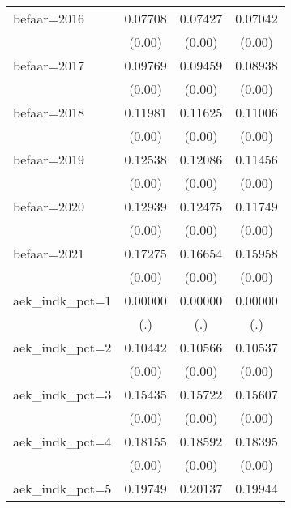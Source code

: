 \begin{table}[htbp]
\begin{tabular}{l*{3}{c}}
befaar=2016         &     0.07708\sym{***}&     0.07427\sym{***}&     0.07042\sym{***}\\
                    &      (0.00)         &      (0.00)         &      (0.00)         \\
befaar=2017         &     0.09769\sym{***}&     0.09459\sym{***}&     0.08938\sym{***}\\
                    &      (0.00)         &      (0.00)         &      (0.00)         \\
befaar=2018         &     0.11981\sym{***}&     0.11625\sym{***}&     0.11006\sym{***}\\
                    &      (0.00)         &      (0.00)         &      (0.00)         \\
befaar=2019         &     0.12538\sym{***}&     0.12086\sym{***}&     0.11456\sym{***}\\
                    &      (0.00)         &      (0.00)         &      (0.00)         \\
befaar=2020         &     0.12939\sym{***}&     0.12475\sym{***}&     0.11749\sym{***}\\
                    &      (0.00)         &      (0.00)         &      (0.00)         \\
befaar=2021         &     0.17275\sym{***}&     0.16654\sym{***}&     0.15958\sym{***}\\
                    &      (0.00)         &      (0.00)         &      (0.00)         \\
aek\_indk\_pct=1      &     0.00000         &     0.00000         &     0.00000         \\
                    &         (.)         &         (.)         &         (.)         \\
aek\_indk\_pct=2      &     0.10442\sym{***}&     0.10566\sym{***}&     0.10537\sym{***}\\
                    &      (0.00)         &      (0.00)         &      (0.00)         \\
aek\_indk\_pct=3      &     0.15435\sym{***}&     0.15722\sym{***}&     0.15607\sym{***}\\
                    &      (0.00)         &      (0.00)         &      (0.00)         \\
aek\_indk\_pct=4      &     0.18155\sym{***}&     0.18592\sym{***}&     0.18395\sym{***}\\
                    &      (0.00)         &      (0.00)         &      (0.00)         \\
aek\_indk\_pct=5      &     0.19749\sym{***}&     0.20137\sym{***}&     0.19944\sym{***}\\

\end{tabular}
\end{table}
